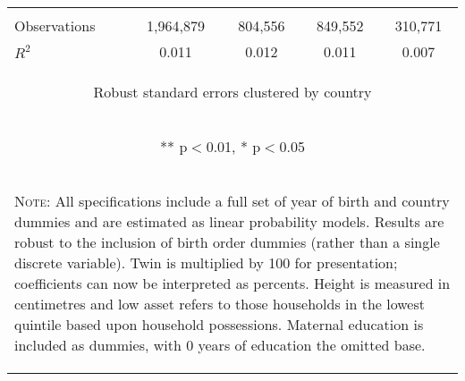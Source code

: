 \documentclass{article}[11pt,subeqn]
\begin{document}
\begin{spacing}{1.5}
\begin{table}[htpb!]
\begin{center}
\begin{tabular}{lcccc}
\vspace{4pt} & \begin{footnotesize}\end{footnotesize} & \begin{footnotesize}\end{footnotesize} & \begin{footnotesize}\end{footnotesize} & \begin{footnotesize}\end{footnotesize} \\
Observations & 1,964,879 & 804,556 & 849,552 & 310,771 \\
 $R^2$ & 0.011 & 0.012 & 0.011 & 0.007 \\ \midrule
\multicolumn{5}{c}{\begin{footnotesize} Robust standard errors clustered by country \end{footnotesize}} \\
\multicolumn{5}{c}{\begin{footnotesize} ** p$<$0.01, * p$<$0.05 \end{footnotesize}} \\
\bottomrule
\multicolumn{5}{p{11cm}}{\setstretch{0.9}\begin{footnotesize}\textsc{Note:} All specifications include a full set of year of birth and country
dummies and are estimated as linear probability models.  Results are robust to the inclusion of birth order dummies (rather than a single discrete 
variable).  Twin is multiplied by 100 for presentation; coefficients can now be interpreted as percents.  Height is measured in centimetres and low
asset refers to those households in the lowest quintile based upon household possessions.  Maternal education is included as dummies, with 0 years of
education the omitted base.\end{footnotesize}}\\
\end{tabular}
\end{center}
\end{table}


\end{spacing}
\end{document}
